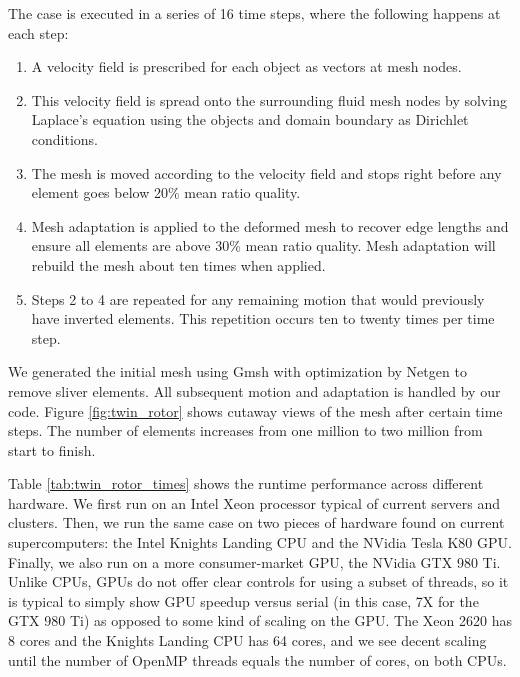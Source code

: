 The case is executed in a series of 16 time steps, where the
following happens at each step:
\begin{enumerate}
\item A velocity field is prescribed for each object as vectors
at mesh nodes.
\item This velocity field is spread onto the surrounding fluid
mesh nodes by solving Laplace's equation using the
objects and domain boundary as Dirichlet conditions.
\item The mesh is moved according to the velocity field
and stops right before any element goes below 20\% mean ratio quality. 
\item Mesh adaptation is applied to the deformed mesh to
recover edge lengths and ensure all elements are above 30\%
mean ratio quality.
Mesh adaptation will rebuild the mesh about ten times when applied.
\item Steps 2 to 4 are repeated for any remaining motion
that would previously have inverted elements.
This repetition occurs ten to twenty times per time step.
\end{enumerate}
We generated the initial mesh
using Gmsh \cite{geuzaine2009gmsh} with optimization by Netgen
to remove sliver elements.
All subsequent motion and adaptation is handled by our code.
Figure \ref{fig:twin_rotor} shows cutaway views of the mesh
after certain time steps.
The number of elements increases from one million to two
million from start to finish.

Table \ref{tab:twin_rotor_times} shows the runtime performance across
different hardware.
We first run on an Intel Xeon processor typical of current servers
and clusters.
Then, we run the same case on two pieces of hardware found on
current supercomputers: the Intel Knights Landing CPU
and the NVidia Tesla K80 GPU.
Finally, we also run on a more consumer-market GPU,
the NVidia GTX 980 Ti.
Unlike CPUs, GPUs do not offer clear controls for using a subset
of threads, so it is typical to simply show GPU speedup versus
serial (in this case, 7X for the GTX 980 Ti) as opposed to some
kind of scaling on the GPU.
The Xeon 2620 has 8 cores and the Knights Landing CPU has
64 cores, and we see decent scaling until the number
of OpenMP threads equals the number of cores, on both CPUs.


